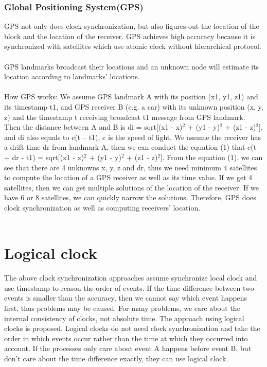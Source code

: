 \documentclass[twoside]{article}
\begin{document}
\subsubsection{Global Positioning System(GPS)}
GPS not only does clock synchronization, but also figures out the location of the block and the location of the receiver. GPS achieves high accuracy because it is synchronized with satellites which use atomic clock without hierarchical protocol.  \\\\
GPS landmarks broadcast their locations and an unknown node will estimate its location according to landmarks’ locations.\\\\
How GPS works: We assume GPS landmark A with its position (x1, y1, z1) and its timestamp t1, and GPS receiver B (e.g. a car) with its unknown position (x, y, z) and the timestamp t receiving broadcast t1 message from GPS landmark. Then the distance between A and B is di = sqrt[(x1 - x)$^2$ + (y1 - y)$^2$ + (z1 - z)$^2$], and di also equals to c(t – t1), c is the speed of light. We assume the receiver has a drift time dr from landmark A, then we can conduct the equation (1) that c(t + dr - t1) = sqrt[(x1 - x)$^2$ + (y1 - y)$^2$ + (z1 - z)$^2$]. From the equation (1), we can see that there are 4 unknowns x, y, z and dr, thus we need minimum 4 satellites to compute the location of a GPS receiver as well as its time value. If we get 4 satellites, then we can get multiple solutions of the location of the receiver. If we have 6 or 8 satellites, we can quickly narrow the solutions. Therefore, GPS does clock synchronization as well as computing receivers’ location.\\\\


\section{Logical clock}
The above clock synchronization approaches assume synchronize local clock and use timestamp to reason the order of events. If the time difference between two events is smaller than the accuracy, then we cannot say which event happens first, thus problems may be caused. For many problems, we care about the internal consistency of clocks, not absolute time. The approach using logical clocks is proposed. Logical clocks do not need clock synchronization and take the order in which events occur rather than the time at which they occurred into account. If the processes only care about event A happens before event B, but don’t care about the time difference exactly, they can use logical clock.
\end{document}

